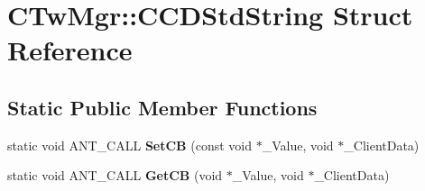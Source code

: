 \hypertarget{struct_c_tw_mgr_1_1_c_c_d_std_string}{\section{C\+Tw\+Mgr\+:\+:C\+C\+D\+Std\+String Struct Reference}
\label{struct_c_tw_mgr_1_1_c_c_d_std_string}
}
\subsection*{Static Public Member Functions}
\begin{DoxyCompactItemize}
\item 
\hypertarget{struct_c_tw_mgr_1_1_c_c_d_std_string_a8ef3b2860d313df707b646a836066d56}{static void A\+N\+T\+\_\+\+C\+A\+L\+L {\bfseries Set\+C\+B} (const void $\ast$\+\_\+\+Value, void $\ast$\+\_\+\+Client\+Data)}\label{struct_c_tw_mgr_1_1_c_c_d_std_string_a8ef3b2860d313df707b646a836066d56}

\item 
\hypertarget{struct_c_tw_mgr_1_1_c_c_d_std_string_a664e2e11af3deef7abb855cd7715479d}{static void A\+N\+T\+\_\+\+C\+A\+L\+L {\bfseries Get\+C\+B} (void $\ast$\+\_\+\+Value, void $\ast$\+\_\+\+Client\+Data)}\label{struct_c_tw_mgr_1_1_c_c_d_std_string_a664e2e11af3deef7abb855cd7715479d}

\end{DoxyCompactItemize}
